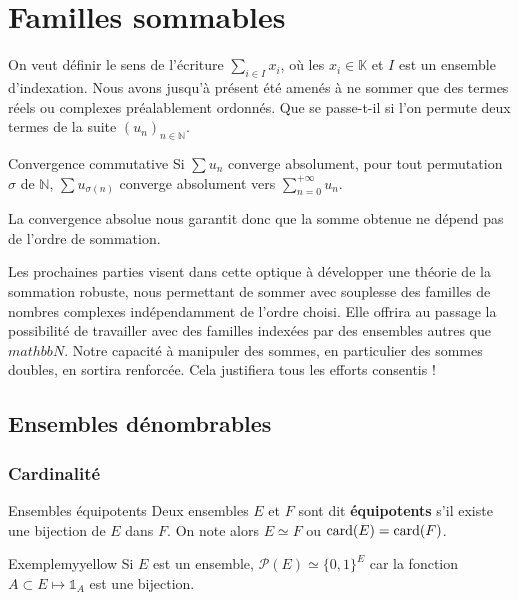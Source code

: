 \section{Familles sommables} 

    On veut définir le sens de l’écriture $\sum_{i \in I} x_i$, où les $x_i \in \mathbb{K}$ et $I$ est un ensemble d’indexation. Nous avons jusqu’à présent été amenés à ne sommer que des termes réels ou complexes préalablement ordonnés. Que se passe-t-il si l’on permute deux termes de la suite $(u_n)_{n \in \mathbb{N}}$. 

    \begin{theo}{Convergence commutative}{}
        Si $\sum u_n$ converge absolument, pour tout permutation $\sigma$ de $\mathbb{N}$, $\sum u_{\sigma(n)}$ converge absolument vers $\sum_{n = 0}^{+\infty} u_n$.
    \end{theo}

    La convergence absolue nous garantit donc que la somme obtenue ne dépend pas de l’ordre de sommation.

    Les prochaines parties visent dans cette optique à développer une théorie de la sommation robuste, nous permettant de sommer avec souplesse des familles de nombres complexes indépendamment de l’ordre choisi. Elle offrira au passage la possibilité de travailler avec des familles indexées par des ensembles autres que $mathbb{N}$. Notre capacité à manipuler des sommes, en particulier des sommes doubles, en sortira renforcée. Cela justifiera tous les efforts consentis !

    \subsection{Ensembles dénombrables}

    \subsubsection{Cardinalité}

    \begin{defi}{Ensembles équipotents}{}
        Deux ensembles $E$ et $F$ sont dit \textbf{équipotents} s’il existe une bijection de $E$ dans $F$. On note alors $E \simeq F$ ou $\operatorname{card}(E) = \operatorname{card}(F)$.
    \end{defi}

    \begin{omed}{Exemple}{myyellow}
        Si $E$ est un ensemble, $\mathcal{P}(E) \simeq \big\{ 0,1 \big\}^E$ car la fonction $A \subset E \mapsto \mathbb{1}_A$ est une bijection.
    \end{omed}

